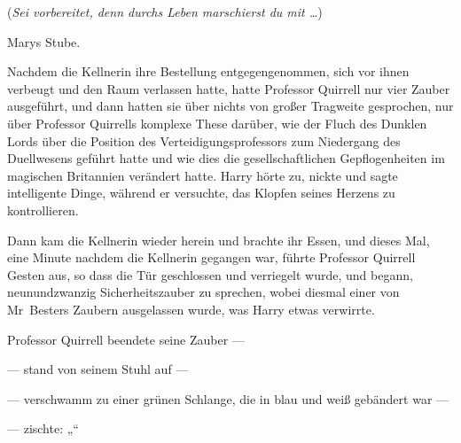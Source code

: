 (\emph{Sei vorbereitet, denn durchs Leben marschierst du mit …})

Marys Stube.

Nachdem die Kellnerin ihre Bestellung entgegengenommen, sich vor ihnen verbeugt und den Raum verlassen hatte, hatte Professor Quirrell nur vier Zauber ausgeführt, und dann hatten sie über nichts von großer Tragweite gesprochen, nur über Professor Quirrells komplexe These darüber, wie der Fluch des Dunklen Lords über die Position des Verteidigungsprofessors zum Niedergang des Duellwesens geführt hatte und wie dies die gesellschaftlichen Gepflogenheiten im magischen Britannien verändert hatte. Harry hörte zu, nickte und sagte intelligente Dinge, während er versuchte, das Klopfen seines Herzens zu kontrollieren.

Dann kam die Kellnerin wieder herein und brachte ihr Essen, und dieses Mal, eine Minute nachdem die Kellnerin gegangen war, führte Professor Quirrell Gesten aus, so dass die Tür geschlossen und verriegelt wurde, und begann, neunundzwanzig Sicherheitszauber zu sprechen, wobei diesmal einer von Mr~Besters Zaubern ausgelassen wurde, was Harry etwas verwirrte.

Professor Quirrell beendete seine Zauber —

— stand von seinem Stuhl auf —

— verschwamm zu einer grünen Schlange, die in blau und weiß gebändert war —

— zischte: „“

